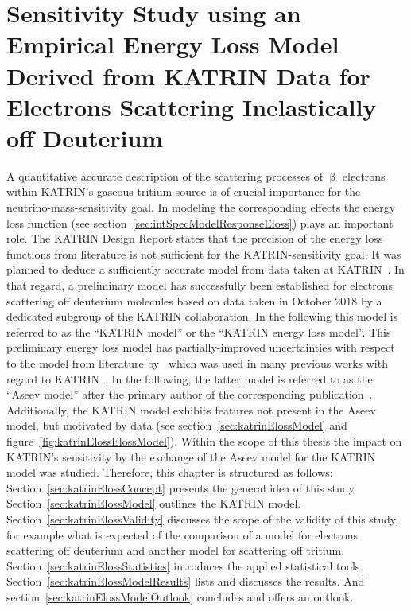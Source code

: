 \def\currentRootFolder{chapter/sensitivityStudyWithPreliminaryKatrinElossModel}
\def\currentFigureFolder{\currentRootFolder/fig}

\chapter{Sensitivity Study using an Empirical Energy Loss Model Derived from KATRIN Data for Electrons Scattering Inelastically off Deuterium}
\label{sec:katrinEloss}
A quantitative accurate description of the scattering processes of $\upbeta$ electrons within KATRIN's gaseous tritium source is of crucial importance for the neutrino-mass-sensitivity goal. In modeling the corresponding effects the energy loss function (see section~\ref{sec:intSpecModelResponseEloss}) plays an important role. The KATRIN Design Report states that the precision of the energy loss functions from literature is not sufficient for the KATRIN-sensitivity goal. It was planned to deduce a sufficiently accurate model from data taken at KATRIN~\cite{Angrik:2005ep}. In that regard, a preliminary model has successfully been established for electrons scattering off deuterium molecules based on data taken in October 2018 by a dedicated subgroup of the KATRIN collaboration. In the following this model is referred to as the ``KATRIN model'' or the ``KATRIN energy loss model''. This preliminary energy loss model has partially-improved uncertainties with respect to the model from literature by~\cite{Aseev2000} which was used in many previous works with regard to KATRIN~\cite{Groh2015,Kleesiek2014, Kleesiek2019, SeitzM2019}. In the following, the latter model is referred to as the ``Aseev model'' after the primary author of the corresponding publication~\cite{Aseev2000}. Additionally, the KATRIN model exhibits features not present in the Aseev model, but motivated by data (see section~\ref{sec:katrinElossModel} and figure~\ref{fig:katrinElossElossModel}). Within the scope of this thesis the impact on KATRIN's sensitivity by the exchange of the Aseev model for the KATRIN model was studied. Therefore, this chapter is structured as follows: Section~\ref{sec:katrinElossConcept} presents the general idea of this study. Section~\ref{sec:katrinElossModel} outlines the KATRIN model. Section~\ref{sec:katrinElossValidity} discusses the scope of the validity of this study, for example what is expected of the comparison of a model for electrons scattering off deuterium and another model for scattering off tritium. Section~\ref{sec:katrinElossStatistics} introduces the applied statistical tools. Section~\ref{sec:katrinElossModelResults} lists and discusses the results. And section~\ref{sec:katrinElossModelOutlook} concludes and offers an outlook.

